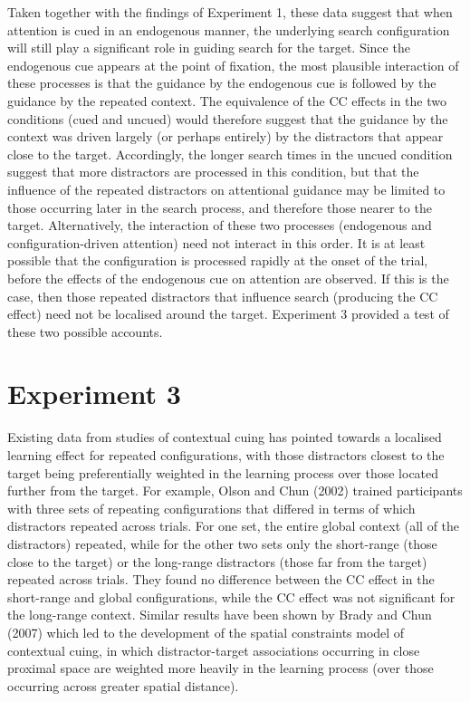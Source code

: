 \documentclass[
  man,
  floatsintext,
  longtable,
  nolmodern,
  notxfonts,
  notimes,
  colorlinks=true,linkcolor=blue,citecolor=blue,urlcolor=blue]{apa7}
\begin{document}
Taken together with the findings of Experiment 1, these data suggest
that when attention is cued in an endogenous manner, the underlying
search configuration will still play a significant role in guiding
search for the target. Since the endogenous cue appears at the point of
fixation, the most plausible interaction of these processes is that the
guidance by the endogenous cue is followed by the guidance by the
repeated context. The equivalence of the CC effects in the two
conditions (cued and uncued) would therefore suggest that the guidance
by the context was driven largely (or perhaps entirely) by the
distractors that appear close to the target. Accordingly, the longer
search times in the uncued condition suggest that more distractors are
processed in this condition, but that the influence of the repeated
distractors on attentional guidance may be limited to those occurring
later in the search process, and therefore those nearer to the target.
Alternatively, the interaction of these two processes (endogenous and
configuration-driven attention) need not interact in this order. It is
at least possible that the configuration is processed rapidly at the
onset of the trial, before the effects of the endogenous cue on
attention are observed. If this is the case, then those repeated
distractors that influence search (producing the CC effect) need not be
localised around the target. Experiment 3 provided a test of these two
possible accounts.

\section{Experiment 3}\label{experiment-3}

Existing data from studies of contextual cuing has pointed towards a
localised learning effect for repeated configurations, with those
distractors closest to the target being preferentially weighted in the
learning process over those located further from the target. For
example, Olson and Chun (2002) trained participants with three sets of
repeating configurations that differed in terms of which distractors
repeated across trials. For one set, the entire global context (all of
the distractors) repeated, while for the other two sets only the
short-range (those close to the target) or the long-range distractors
(those far from the target) repeated across trials. They found no
difference between the CC effect in the short-range and global
configurations, while the CC effect was not significant for the
long-range context. Similar results have been shown by Brady and Chun
(2007) which led to the development of the spatial constraints model of
contextual cuing, in which distractor-target associations occurring in
close proximal space are weighted more heavily in the learning process
(over those occurring across greater spatial distance).
\end{document}
